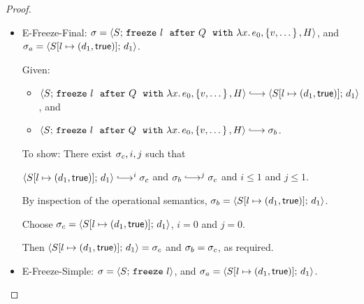 \begin{proof}
\begin{itemize}
\begin{itemize}
\begin{enumerate}
          The proof is as follows:

          From the premises of {\sc E-Spawn-Handler}, \\
          $S(l) = \state{d_1}{\status_1}$ and
          $d_2 \userleq d_1$ and 
          $d_2 \notin H$ and
          $d_2 \in Q$.

          Hence, by {\sc E-Spawn-Handler}, \\
          $\config{S'}{\freezeafterfull{l}{Q}{\lam{x}{e_0}}{\setof{e',
              \dots}}{H}} \parstepsto \\
          \config{S'}{\freezeafterfull{l}{Q}{\lam{x}{e_0}}{\setof{\subst{e_0}{x}{d_2}, e',
                \dots}}{\{d_2\}\cup H}}$.

          Hence $\conf_b \parstepsto \conf_c$.
        \end{enumerate}

      \end{itemize}

    \item {\sc E-Freeze-Final}: $\sigma =
      \langle S;\, \mbox{\texttt{freeze}}~l~~{\mbox{\texttt{after}}}~Q~~{\mbox{\texttt{with}}}~\lambda x.\,e_0, \left\{v,
            \dots\right\}, H \rangle$, and $\sigma_a =
      \langle S[l \mapsto (d_1, \textsf{true})];\, d_1 \rangle$.

      Given:
      \begin{itemize}
      \item $\config{S}{\freezeafterfull{l}{Q}{\lam{x}{e_0}}{\setof{v,
            \dots}}{H}} \parstepsto
        \config{\extS{S}{l}{d_1}{\frozentrue}}{d_1}$, and
      \item $\config{S}{\freezeafterfull{l}{Q}{\lam{x}{e_0}}{\setof{v,
            \dots}}{H}} \parstepsto \conf_b$.
      \end{itemize}

      To show: There exist $\sigma_c, i, j$ such that

      $\config{\extS{S}{l}{d_1}{\frozentrue}}{d_1} \parstepsto^i
      \conf_c$ and $\conf_b \parstepsto^j \conf_c$ and $i \leq 1$ and
      $j \leq 1$.

      By inspection of the operational semantics, $\sigma_b =
      \langle S[l \mapsto (d_1, \textsf{true})];\, d_1 \rangle$.

      Choose $\sigma_c = \langle S[l \mapsto (d_1, \textsf{true})];\, d_1 \rangle$,
      $i = 0$ and $j = 0$.

      Then $\langle S[l \mapsto (d_1, \textsf{true})];\, d_1 \rangle = \sigma_c$ and
      $\sigma_b = \sigma_c$, as required.

    \item {\sc E-Freeze-Simple}: $\sigma =
      \langle S;\, \mbox{\texttt{freeze}}~l \rangle$, and $\sigma_a =
      \langle S[l \mapsto (d_1, \textsf{true})];\, d_1 \rangle$.


\end{itemize}
\end{proof}
